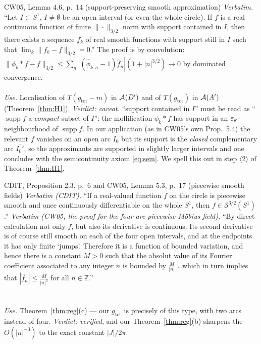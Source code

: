 \documentclass[11pt]{article}
\newcommand{\gtot}{g_{\mathrm{tot}}}
\newcommand{\supp}{\operatorname{supp}}
\begin{document}
\begin{citedbox}{CW05, Lemma 4.6, p.~14 (support-preserving smooth approximation)}
\emph{Verbatim.} ``Let $I\subset S^1$, $I\ne\emptyset$ be an open interval (or even the whole circle).  If $f$ is a
real continuous function of finite $\|\cdot\|_{3/2}$ norm with support contained in $I$, then there exists a sequence
$f_k$ of real smooth functions with support still in $I$ such that $\lim_k\|f_k-f\|_{3/2}=0$.''
The proof is by convolution: $\|\phi_k*f-f\|_{3/2}\le\sum_n|(\hat\phi_{k,n}-1)\hat f_n|(1+|n|^{3/2})\to0$ by
dominated convergence.\\[2pt]
\\[2pt]
\emph{Use.}  Localisation of $T(\gtot-m)$ in $\mathcal A(D')$ and of $T(\gtot)$ in $\mathcal A(A')$ (Theorem~\ref{thm:H1}).
\emph{Verdict: caveat.}  ``support contained in $I$'' must be read as ``$\supp f$ a \emph{compact} subset of $I$'':
the mollification $\phi_k*f$ has support in an $\varepsilon_k$-neighbourhood of $\supp f$.  In our application (as in CW05's
own Prop.~5.4) the relevant $f$ vanishes on an open arc $I_0$ but its support is the \emph{closed} complementary arc
$\overline{I_0'}$, so the approximants are supported in slightly larger intervals and one concludes with the
semicontinuity axiom \eqref{eq:sem}.  We spell this out in step $\langle2\rangle$ of Theorem~\ref{thm:H1}.
\end{citedbox}

\begin{citedbox}{CDIT, Proposition 2.3, p.~6 and CW05, Lemma 5.3, p.~17 (piecewise smooth fields)}
\emph{Verbatim (CDIT).} ``If a real-valued function $f$ on the circle is piecewise smooth and once continuously
differentiable on the whole $S^1$, then $f\in\mathcal S^{3/2}(S^1)$.''  \emph{Verbatim (CW05, the proof for the
four-arc piecewise-M\"obius field).}  ``By direct calculation not only $f$, but also its derivative is continuous.
Its second derivative is of course still smooth on each of the four open intervals, and at the endpoints it has only
finite `jumps'.  Therefore it is a function of bounded variation, and hence there is a constant $M>0$ such that the
absolut value of its Fourier coefficient associated to any integer $n$ is bounded by $\frac M{|n|}$ \dots which in
turn implies that $|\hat f_n|\le\frac M{|n|^3}$ for all $n\in\mathbb Z$.''\\[2pt]
\\
\\[2pt]
\emph{Use.}  Theorem~\ref{thm:reg}(c) --- our $\gtot$ is precisely of this type, with two arcs instead of four.
\emph{Verdict: verified}, and our Theorem~\ref{thm:reg}(b) sharpens the $O(|n|^{-3})$ to the exact constant $|J|/2\pi$.
\end{citedbox}
\end{document}
